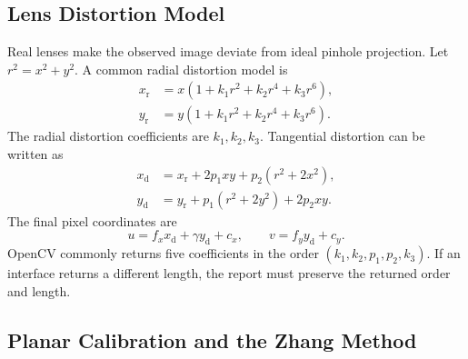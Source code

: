 \subsection{Lens Distortion Model}\label{sec:task2-distortion}

Real lenses make the observed image deviate from ideal pinhole projection. Let \(r^{2}=x^{2}+y^{2}\). A common radial distortion model is
\begin{equation}
\begin{aligned}
x_{\mathrm r}&=x\left(1+k_{1}r^{2}+k_{2}r^{4}+k_{3}r^{6}\right),\\
y_{\mathrm r}&=y\left(1+k_{1}r^{2}+k_{2}r^{4}+k_{3}r^{6}\right).
\end{aligned}
\label{eq:task2-radial-distortion}
\end{equation}
The radial distortion coefficients are \(k_1,k_2,k_3\). Tangential distortion can be written as
\begin{equation}
\begin{aligned}
x_{\mathrm d}&=x_{\mathrm r}+2p_{1}xy+p_{2}\left(r^{2}+2x^{2}\right),\\
y_{\mathrm d}&=y_{\mathrm r}+p_{1}\left(r^{2}+2y^{2}\right)+2p_{2}xy.
\end{aligned}
\label{eq:task2-tangential-distortion}
\end{equation}
The final pixel coordinates are
\begin{equation}
u=f_xx_{\mathrm d}+\gamma y_{\mathrm d}+c_x,\qquad
v=f_yy_{\mathrm d}+c_y.
\label{eq:task2-distorted-pixel}
\end{equation}
OpenCV commonly returns five coefficients in the order
\((k_1,k_2,p_1,p_2,k_3)\). If an interface returns a different length, the report must preserve the returned order and length.

\subsection{Planar Calibration and the Zhang Method}\label{sec:task2-zhang}

